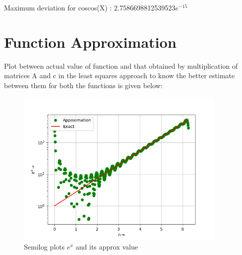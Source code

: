 \documentclass[10pt,a4paper]{article}
\begin{document}
Maximum deviation for coscos(X) : 2.7586698812539523$e^{-15}$



\section{Function Approximation}
Plot between actual value of function and that obtained by multiplication of matrices A and c in the least squares approach to know the better estimate between them for both the functions is given below:
\newline
\newline
\newline
\newline
\newline
\newline
\newline\newline
\newline
\newline
\newline
\newline
\newline
\newline
\newline
\newline
\newline
\newline
\newline
\newline\newline
\newline
\newline
\newline
\newline
\newline
\newline
\newline
\begin{figure}[!tbh]
\includegraphics[width = 0.9\textwidth]{7a.png}
\caption{Semilog plots $e^{x}$ and its approx value}
\end{figure} 
\end{document}
